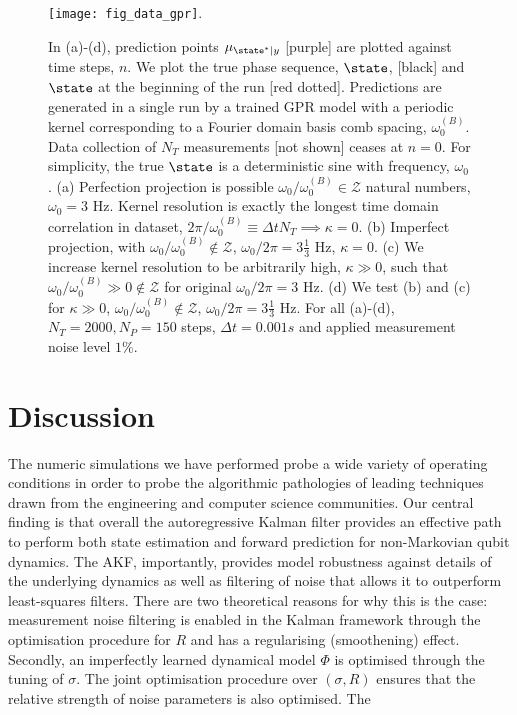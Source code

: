  
\begin{figure}
    \texttt{[image: fig\_data\_gpr]}. 
    \caption{\label{fig:main:fig_data_gpr} In (a)-(d), prediction points $\mu_{\state^*|y}$ [purple] are plotted against time steps, $n$. We plot the true phase sequence,  $\state$, [black] and  $\state$ at the beginning of the run [red dotted]. Predictions are generated in a single run by a trained GPR model with a periodic kernel corresponding to a Fourier domain basis comb spacing, $\omega_0^{(B)}$. Data collection of $N_T$ measurements [not shown] ceases at $n=0$. For simplicity, the true $\state$ is a deterministic sine with frequency, $\omega_0$. (a) Perfection projection is possible $\omega_0 / \omega_0^{(B)} \in \mathcal{Z}$ natural numbers, $\omega_0 = 3$ Hz. Kernel resolution is exactly the longest time domain correlation in dataset, $2 \pi / \omega_0^{(B)} \equiv \Delta t N_T \implies \kappa = 0$.   (b) Imperfect projection, with $\omega_0 / \omega_0^{(B)} \notin \mathcal{Z}$, $\omega_0 / 2 \pi = 3 \frac{1}{3}$ Hz, $\kappa=0$. (c) We increase kernel resolution to be arbitrarily high, $\kappa \gg 0 $, such that $\omega_0 / \omega_0^{(B)} \gg 0 \notin \mathcal{Z}$ for original $ \omega_0 / 2 \pi = 3$ Hz. (d) We test (b) and (c) for $\kappa \gg0$, $ \omega_0 / \omega_0^{(B)} \notin \mathcal{Z}$, $\omega_0 / 2 \pi = 3 \frac{1}{3}$ Hz. For all (a)-(d), $N_T = 2000, N_P = 150$ steps, $\Delta t = 0.001s$ and applied measurement noise level $1\%$.} 
\end{figure}



\section{Discussion} \label{sec:main:discussion}
The numeric simulations we have performed probe a wide variety of operating conditions in order to probe the algorithmic pathologies of leading techniques drawn from the engineering and computer science communities.  Our central finding is that overall the autoregressive Kalman filter provides an effective path to perform both state estimation and forward prediction for non-Markovian qubit dynamics. The AKF, importantly, provides model robustness against details of the underlying dynamics as well as filtering of noise that allows it to outperform least-squares filters.  There are two theoretical reasons for why this is the case: measurement noise filtering is enabled in the Kalman framework through the optimisation procedure for $R$ and has a regularising (smoothening) effect. Secondly, an imperfectly learned dynamical model $\Phi$ is optimised through the tuning of $\sigma$. The joint optimisation procedure over $(\sigma, R)$ ensures that the relative strength of noise parameters is also optimised.  The 

